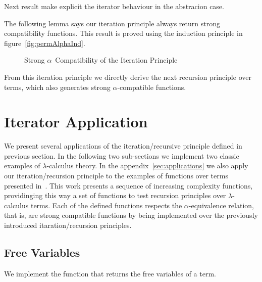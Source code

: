 \documentclass{entcs}
\newcommand{\alp}{\ensuremath{\alpha}}
\newcommand{\lamb}{\ensuremath{\lambda}}
\begin{document}
Next result make explicit the iterator behaviour in the abstracion case.

 \hspace{5px}

The following lemma says our iteration principle always return strong compatibility functions. This result is proved using the induction principle in figure~\ref{fig:permAlphaInd}. 

\begin{figure}[!ht]
  \caption{Strong \alp\ Compatibility of the Iteration Principle}
\label{fig:strongAlphaComp}
\end{figure}

From this iteration principle we directly derive the next recursion principle over terms, which also generates strong \alp-compatible functions.


\section{Iterator Application}
\label{sec:itapp}

We present several applications of the iteration/recursive principle defined in previous section. In the following two sub-sections we implement two classic examples of \lamb-calculus theory. In the appendix~\ref{sec:applications} we also apply our iteration/recursion principle to the examples of functions over terms presented in~\cite{Norrish04recursivefunction}. This work presents a sequence of increasing complexity functions,  providinging this way a set of functions to test recursion principles over \lamb-calculus terms. Each of the defined functions respects the \alp-equivalence relation, that is, are strong compatible functions by being implemented over the previously introduced itaration/recursion principles. 

\subsection{Free Variables}
\label{sec:freevar}

We implement the function that returns the free variables of a term.

 \hspace{5px}
\end{document}
